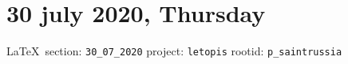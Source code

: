  
 
\section{30 july 2020, Thursday}

\vspace{0.5cm}
{\small\LaTeX~section: \verb|30_07_2020| project: \verb|letopis| rootid: \verb|p_saintrussia|}
\vspace{0.5cm}




